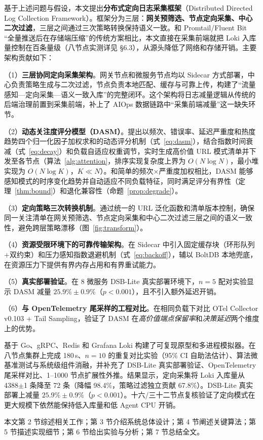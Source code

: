 基于上述问题与假设，本文提出\textbf{分布式定向日志采集框架}（Distributed Directed Log Collection Framework）。框架分为三层：\textbf{网关预筛选、节点定向采集、中心二次过滤}，三层之间通过三次策略转换保持语义一致。和 Promtail/Fluent Bit ``全量推送后在存储端压缩''的传统方案相比，本文直接在采集前端就把 Loki 入库量控制在百条量级（八节点实测详见 §6.3），从源头降低了网络和存储开销。主要架构贡献如下：

（1）\textbf{三层协同定向采集架构}。网关节点和微服务节点均以 Sidecar 方式部署，中心负责策略生成与二次过滤，节点负责本地匹配、缓存与可靠上传，构建了``流量感知—定向采集—语义一致入库''的完整闭环。这个架构将日志减量逻辑从传统的后端治理前置到采集前端，补上了 AIOps 数据链路中``采集前端减量''这一缺失环节。

（2）\textbf{动态关注度评分模型（DASM）}。提出以频次、错误率、延迟严重度和热度趋势四个归一化因子加权求和的动态评分机制（式~\ref{eq:dasm}），结合指数时间衰减（式~\ref{eq:decay}）和负载自适应权重调节，实时生成高价值 URL 模式清单并下发至各节点（算法~\ref{alg:attention}，排序实现复杂度上界为 $O(N\log N)$，最小堆实现为 $O(N\log K)$，$K \ll N$）。和简单的频次$\times$严重度加权相比，DASM 能够感知模式的时序变化趋势并自动适应不同负载特征，同时满足评分有界性（定理~\ref{thm:bound}）和退化兼容性（命题~\ref{prop:degrade}）。

（3）\textbf{定向策略三次转换机制}。通过统一的 URL 泛化函数和清单版本控制，确保同一关注清单在网关预筛选、节点定向采集和中心二次过滤三层之间的语义一致性，避免跨层策略漂移（图~\ref{fig:transform}）。

（4）\textbf{资源受限环境下的可靠传输架构}。在 Sidecar 中引入固定缓存块（环形队列+双约束）和压力感知指数退避机制（式~\ref{eq:backoff}），辅以 BoltDB 本地兜底，在资源压力下提供有界内存占用和有界重试能力。

（5）\textbf{真实部署验证}。在 8 微服务 DSB-Lite 真实部署环境下，$n{=}5$ 配对实验显示 DASM 减量 $25.9\% \pm 0.9\%$（$p<0.001$），且不引入额外延迟开销。

（6）\textbf{与 OpenTelemetry 尾采样的工程对比}。在相同负载下对比 OTel Collector v0.103 + Tail Sampling，验证了 DASM 在\emph{高价值端点保留率}和\emph{决策延迟}两个维度上的优势。

基于 Go、gRPC、Redis 和 Grafana Loki 构建了可复现原型和多进程模拟器。在八节点集群上完成 180\,s、$n{=}10$ 的重复对比实验（95\% CI 自助法估计）、算法微基准测试与系统级组件消融，并补充了 DSB-Lite 真实部署验证、OpenTelemetry 尾采样对比、1--1000 节点扩展性外推。结果显示，定向采集将 Loki 入库量从 4388$\pm$1 条降至 72 条（降幅 98.4\%，策略过滤独立贡献 67.8\%）。DSB-Lite 真实部署上减量 $25.9\% \pm 0.9\%$（$p<0.001$）。十六/三十二节点复核验证了定向模式在更大规模下依然能保持低入库量和低 Agent CPU 开销。

本文第 2 节综述相关工作；第 3 节介绍系统总体设计；第 4 节阐述关键算法；第 5 节描述实现细节；第 6 节给出实验与分析；第 7 节总结全文。
